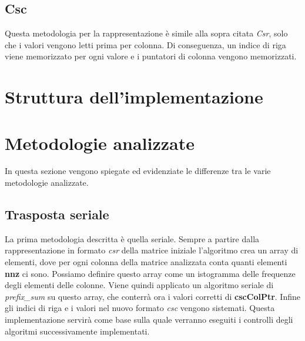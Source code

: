 \documentclass[]{IEEEtran}
\begin{document}
	\subsection{Csc}
	\label{csc}
 	Questa metodologia per la rappresentazione è simile alla sopra citata \textit{Csr}, solo che i valori vengono letti prima per colonna. Di conseguenza, un indice di riga viene memorizzato per ogni valore e i puntatori di colonna vengono memorizzati.
 	
\section{Struttura dell'implementazione} 


\section{Metodologie analizzate}
\label{metodologie}
	In questa sezione vengono spiegate ed evidenziate le differenze tra le varie metodologie analizzate. 
		
	\subsection{Trasposta seriale}
	La prima metodologia descritta è quella seriale. Sempre a partire dalla rappresentazione in formato \textit{csr} della matrice iniziale l'algoritmo crea un array di elementi, dove per ogni colonna della matrice analizzata conta quanti elementi \textbf{nnz} ci sono. Possiamo definire questo array come un istogramma delle frequenze degli elementi delle colonne. Viene quindi applicato un algoritmo seriale di \textit{prefix\_sum} su questo array, che conterrà ora i valori corretti di \textbf{cscColPtr}. Infine gli indici di riga e i valori nel nuovo formato \textit{csc} vengono sistemati.\newline
	Questa implementazione servirà come base sulla quale verranno eseguiti i controlli degli algoritmi successivamente implementati.
	
\end{document}
